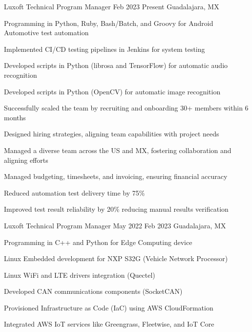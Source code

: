 \documentclass{resume} %
\begin{document}
\job
    {Luxoft}
    {Technical Program Manager}
    {Feb 2023}
    {Present}
    {Guadalajara, MX}
    {
    \begin{itemize-bullets}
    \item{Programming in Python, Ruby, Bash/Batch, and Groovy for Android Automotive test automation}
    \item{Implemented CI/CD testing pipelines in Jenkins for system testing}
    \item{Developed scripts in Python (librosa and TensorFlow) for automatic audio recognition}
    \item{Developed scripts in Python (OpenCV) for automatic image recognition}
    \item{Successfully scaled the team by recruiting and onboarding 30+ members within 6 months}
    \item{Designed hiring strategies, aligning team capabilities with project needs}
    \item{Managed a diverse team across the US and MX, fostering collaboration and aligning efforts}
    \item{Managed budgeting, timesheets, and invoicing, ensuring financial accuracy}
    \item{Reduced automation test delivery time by 75\%}
    \item{Improved test result reliability by 20\% reducing manual results verification}
    \end{itemize-bullets}
    }


\job
    {Luxoft}
    {Technical Program Manager}
    {May 2022}
    {Feb 2023}
    {Guadalajara, MX}
    {
    \begin{itemize-bullets}
    \item{Programming in C++ and Python for Edge Computing device}
    \item{Linux Embedded development for NXP S32G (Vehicle Network Processor)}
    \item{Linux WiFi and LTE drivers integration (Quectel)}
    \item{Developed CAN communications components (SocketCAN)}
    \item{Provisioned Infrastructure as Code (IaC) using AWS CloudFormation}
    \item{Integrated AWS IoT services like Greengrass, Fleetwise, and IoT Core}
    \end{itemize-bullets}
    }
\end{document}
